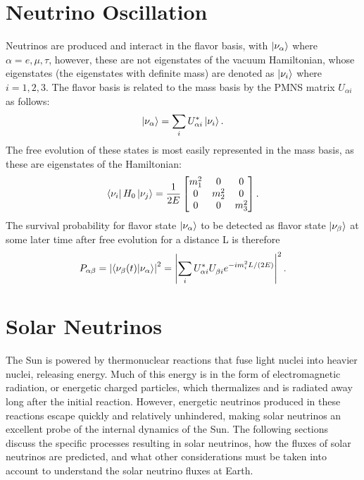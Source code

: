 \section{Neutrino Oscillation}
\label{ch:theory}

Neutrinos are produced and interact in the flavor basis, with $\ket{\nu_{\alpha}}$ where $\alpha = {e,\mu,\tau}$, however, these are not eigenstates of the vacuum Hamiltonian, whose eigenstates (the eigenstates with definite mass) are denoted as $\ket{\nu_i}$ where $i = {1,2,3}$. 
The flavor basis is related to the mass basis by the PMNS matrix $U_{\alpha i}$ as follows:
\begin{equation}
\ket{\nu_{\alpha}} = \sum_i U^*_{\alpha i} \ket{\nu_i}.
\end{equation}
The free evolution of these states is most easily represented in the mass basis, as these are eigenstates of the Hamiltonian:
\begin{equation}
\bra{\nu_i}H_{0}\ket{\nu_j} = \frac{1}{2E}\begin{bmatrix}
m_1^2 & 0 & 0 \\
0 & m_2^2 & 0 \\
0 & 0 & m_3^2
\end{bmatrix}.
\end{equation}
The survival probability for flavor state $\ket{\nu_\alpha}$ to be detected as flavor state $\ket{\nu_\beta}$ at some later time after free evolution for a distance L is therefore
\begin{equation}
P_{\alpha\beta} = \left|\braket{\nu_\beta(t)}{\nu_\alpha}\right|^2 = \left|\sum_i U^*_{\alpha i} U^{}_{\beta i} e^{- i m_i^2 L/(2E)} \right|^2.
\end{equation}

\section{Solar Neutrinos}

The Sun is powered by thermonuclear reactions that fuse light nuclei into heavier nuclei, releasing energy.
Much of this energy is in the form of electromagnetic radiation, or energetic charged particles, which thermalizes and is radiated away long after the initial reaction.
However, energetic neutrinos produced in these reactions escape quickly and relatively unhindered, making solar neutrinos an excellent probe of the internal dynamics of the Sun.
The following sections discuss the specific processes resulting in solar neutrinos, how the fluxes of solar neutrinos are predicted, and what other considerations must be taken into account to understand the solar neutrino fluxes at Earth.

